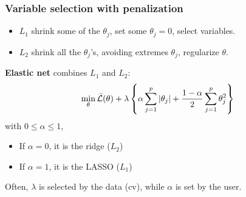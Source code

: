 \begin{frame}
\frametitle{Variable selection with penalization}
\begin{itemize}
\item $L_1$ shrink some of the $\theta_j$, set some $\theta_j = 0$, select variables.
\item $L_2$ shrink all the $\theta_j$'s, avoiding extremes $\theta_j$, regularize $\theta$. 
\end{itemize}
{\bf Elastic net} combines $L_1$ and $L_2$:
$$
\displaystyle \min_\theta \bar{\cal L}(\theta) + \lambda \left\{\alpha \sum_{j=1}^p \vert \theta_j  \vert + \frac{1-\alpha}{2}\sum_{j=1}^p \theta_j^2\right\}
$$
with $0 \leq \alpha \leq 1$,
\begin{itemize}
\item If $\alpha=0$, it is the ridge ($L_2$)
\item If $\alpha=1$, it is the LASSO ($L_1$)
\end{itemize}
Often, $\lambda$ is selected by the data (cv), while $\alpha$ is set by the user.
\end{frame}



